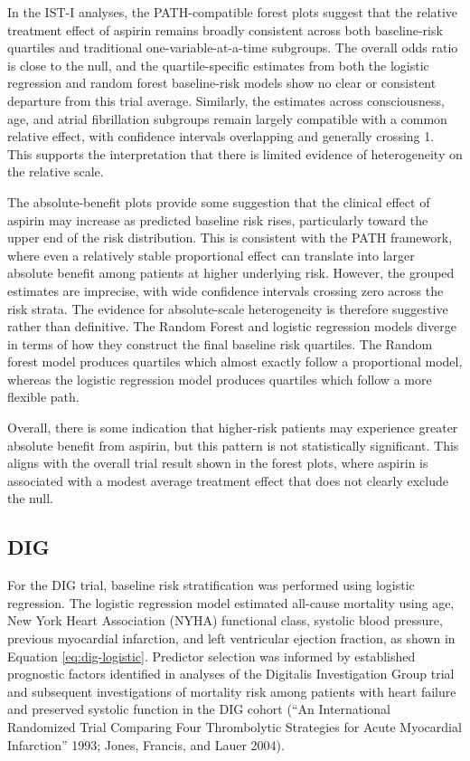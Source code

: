 \documentclass{article}
\begin{document}
In the IST-I analyses, the PATH-compatible forest plots suggest that the
relative treatment effect of aspirin remains broadly consistent across
both baseline-risk quartiles and traditional one-variable-at-a-time
subgroups. The overall odds ratio is close to the null, and the
quartile-specific estimates from both the logistic regression and random
forest baseline-risk models show no clear or consistent departure from
this trial average. Similarly, the estimates across consciousness, age,
and atrial fibrillation subgroups remain largely compatible with a
common relative effect, with confidence intervals overlapping and
generally crossing 1. This supports the interpretation that there is
limited evidence of heterogeneity on the relative scale.

The absolute-benefit plots provide some suggestion that the clinical
effect of aspirin may increase as predicted baseline risk rises,
particularly toward the upper end of the risk distribution. This is
consistent with the PATH framework, where even a relatively stable
proportional effect can translate into larger absolute benefit among
patients at higher underlying risk. However, the grouped estimates are
imprecise, with wide confidence intervals crossing zero across the risk
strata. The evidence for absolute-scale heterogeneity is therefore
suggestive rather than definitive. The Random Forest and logistic
regression models diverge in terms of how they construct the final
baseline risk quartiles. The Random forest model produces quartiles
which almost exactly follow a proportional model, whereas the logistic
regression model produces quartiles which follow a more flexible path.

Overall, there is some indication that higher-risk patients may
experience greater absolute benefit from aspirin, but this pattern is
not statistically significant. This aligns with the overall trial result
shown in the forest plots, where aspirin is associated with a modest
average treatment effect that does not clearly exclude the null.

\subsection{DIG}\label{dig}

For the DIG trial, baseline risk stratification was performed using
logistic regression. The logistic regression model estimated all-cause
mortality using age, New York Heart Association (NYHA) functional class,
systolic blood pressure, previous myocardial infarction, and left
ventricular ejection fraction, as shown in Equation
\ref{eq:dig-logistic}. Predictor selection was informed by established
prognostic factors identified in analyses of the Digitalis Investigation
Group trial and subsequent investigations of mortality risk among
patients with heart failure and preserved systolic function in the DIG
cohort ({``An {International Randomized Trial Comparing Four
Thrombolytic Strategies} for {Acute Myocardial Infarction}''} 1993;
Jones, Francis, and Lauer 2004).
\end{document}

